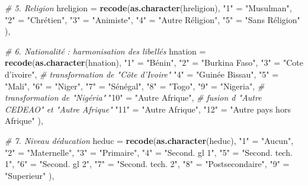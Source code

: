 \documentclass[
]{article}
\newenvironment{Shaded}{\begin{snugshade}}{\end{snugshade}}
\newcommand{\AttributeTok}[1]{\textcolor[rgb]{0.13,0.29,0.53}{#1}}
\newcommand{\CommentTok}[1]{\textcolor[rgb]{0.56,0.35,0.01}{\textit{#1}}}
\newcommand{\FunctionTok}[1]{\textcolor[rgb]{0.13,0.29,0.53}{\textbf{#1}}}
\newcommand{\NormalTok}[1]{#1}
\newcommand{\OtherTok}[1]{\textcolor[rgb]{0.56,0.35,0.01}{#1}}
\newcommand{\StringTok}[1]{\textcolor[rgb]{0.31,0.60,0.02}{#1}}
\begin{document}
\begin{Shaded}
\begin{Highlighting}[]
    \CommentTok{\# 5. Religion}
    \AttributeTok{hreligion =} \FunctionTok{recode}\NormalTok{(}\FunctionTok{as.character}\NormalTok{(hreligion),}
      \StringTok{"1"} \OtherTok{=} \StringTok{"Musulman"}\NormalTok{,}
      \StringTok{"2"} \OtherTok{=} \StringTok{"Chrétien"}\NormalTok{,}
      \StringTok{"3"} \OtherTok{=} \StringTok{"Animiste"}\NormalTok{,}
      \StringTok{"4"} \OtherTok{=} \StringTok{"Autre Réligion"}\NormalTok{,}
      \StringTok{"5"} \OtherTok{=} \StringTok{"Sans Réligion"}
\NormalTok{    ),}
    
    \CommentTok{\# 6. Nationalité : harmonisation des libellés}
    \AttributeTok{hnation =} \FunctionTok{recode}\NormalTok{(}\FunctionTok{as.character}\NormalTok{(hnation),}
      \StringTok{"1"}  \OtherTok{=} \StringTok{"Bénin"}\NormalTok{,}
      \StringTok{"2"}  \OtherTok{=} \StringTok{"Burkina Faso"}\NormalTok{,}
      \StringTok{"3"}  \OtherTok{=} \StringTok{"Cote d’ivoire"}\NormalTok{,  }\CommentTok{\# transformation de "Côte d’Ivoire"}
      \StringTok{"4"}  \OtherTok{=} \StringTok{"Guinée Bissau"}\NormalTok{,}
      \StringTok{"5"}  \OtherTok{=} \StringTok{"Mali"}\NormalTok{,}
      \StringTok{"6"}  \OtherTok{=} \StringTok{"Niger"}\NormalTok{,}
      \StringTok{"7"}  \OtherTok{=} \StringTok{"Sénégal"}\NormalTok{,}
      \StringTok{"8"}  \OtherTok{=} \StringTok{"Togo"}\NormalTok{,}
      \StringTok{"9"}  \OtherTok{=} \StringTok{"Nigeria"}\NormalTok{,       }\CommentTok{\# transformation de "Nigéria"}
      \StringTok{"10"} \OtherTok{=} \StringTok{"Autre Afrique"}\NormalTok{,  }\CommentTok{\# fusion d\textquotesingle{} "Autre CEDEAO" et "Autre Afrique"}
      \StringTok{"11"} \OtherTok{=} \StringTok{"Autre Afrique"}\NormalTok{,}
      \StringTok{"12"} \OtherTok{=} \StringTok{"Autre pays hors Afrique"}
\NormalTok{    ),}
    
    \CommentTok{\# 7. Niveau d\textquotesingle{}éducation}
    \AttributeTok{heduc =} \FunctionTok{recode}\NormalTok{(}\FunctionTok{as.character}\NormalTok{(heduc),}
      \StringTok{"1"} \OtherTok{=} \StringTok{"Aucun"}\NormalTok{,}
      \StringTok{"2"} \OtherTok{=} \StringTok{"Maternelle"}\NormalTok{,}
      \StringTok{"3"} \OtherTok{=} \StringTok{"Primaire"}\NormalTok{,}
      \StringTok{"4"} \OtherTok{=} \StringTok{"Second. gl 1"}\NormalTok{,}
      \StringTok{"5"} \OtherTok{=} \StringTok{"Second. tech. 1"}\NormalTok{,}
      \StringTok{"6"} \OtherTok{=} \StringTok{"Second. gl 2"}\NormalTok{,}
      \StringTok{"7"} \OtherTok{=} \StringTok{"Second. tech. 2"}\NormalTok{,}
      \StringTok{"8"} \OtherTok{=} \StringTok{"Postsecondaire"}\NormalTok{,}
      \StringTok{"9"} \OtherTok{=} \StringTok{"Superieur"}
\NormalTok{    ),}
    

\end{Highlighting}
\end{Shaded}
\end{document}
